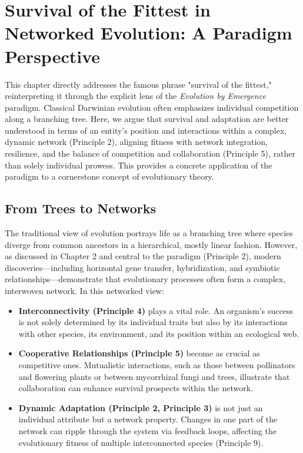 \chapter{Survival of the Fittest in Networked Evolution: A Paradigm Perspective} %
\label{ch:NetworkedFitness}

This chapter directly addresses the famous phrase "survival of the fittest," reinterpreting it through the explicit lens of the \emph{Evolution by Emergence} paradigm. Classical Darwinian evolution often emphasizes individual competition along a branching tree. Here, we argue that survival and adaptation are better understood in terms of an entity's position and interactions within a complex, dynamic network (Principle 2), aligning fitness with network integration, resilience, and the balance of competition and collaboration (Principle 5), rather than solely individual prowess. This provides a concrete application of the paradigm to a cornerstone concept of evolutionary theory. %

\section{From Trees to Networks}
The traditional view of evolution portrays life as a branching tree where species diverge from common ancestors in a hierarchical, mostly linear fashion. However, as discussed in Chapter 2 and central to the paradigm (Principle 2), modern discoveries—including horizontal gene transfer, hybridization, and symbiotic relationships—demonstrate that evolutionary processes often form a complex, interwoven network. In this networked view:
\begin{itemize}
    \item \textbf{Interconnectivity (Principle 4)} plays a vital role. An organism's success is not solely determined by its individual traits but also by its interactions with other species, its environment, and its position within an ecological web.
    \item \textbf{Cooperative Relationships (Principle 5)} become as crucial as competitive ones. Mutualistic interactions, such as those between pollinators and flowering plants or between mycorrhizal fungi and trees, illustrate that collaboration can enhance survival prospects within the network.
    \item \textbf{Dynamic Adaptation (Principle 2, Principle 3)} is not just an individual attribute but a network property. Changes in one part of the network can ripple through the system via feedback loops, affecting the evolutionary fitness of multiple interconnected species (Principle 9).
\end{itemize} %


